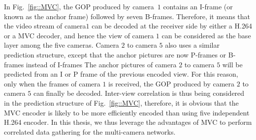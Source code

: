In Fig.~\ref{fig::MVC}, the GOP produced by camera~$1$ contains an I-frame (or known as the anchor frame) followed by seven B-frames.
Therefore, it means that the video stream of camera$1$ can be decoded at the receiver side by either a H.264 or a MVC decoder, and hence the view of camera $1$ can be considered as the base layer among the five cameras.
Camera $2$ to camera $5$ also uses a similar prediction structure, except that the anchor pictures are now P-frames or B-frames instead of I-frames
The anchor pictures of camera $2$ to camera $5$ will be predicted from an I or P frame of the previous encoded view.
For this reason, only when the frames of camera $1$ is received, the GOP produced by camera $2$ to camera $5$ can finally be decoded.
Inter-view correlation is thus being considered in the prediction structure of Fig.~\ref{fig::MVC}, therefore, it is obvious that the MVC encoder is likely to be more efficiently encoded than using five independent H.264 encoder.
In this thesis, we thus leverage the advantages of MVC to perform correlated data gathering for the multi-camera networks.